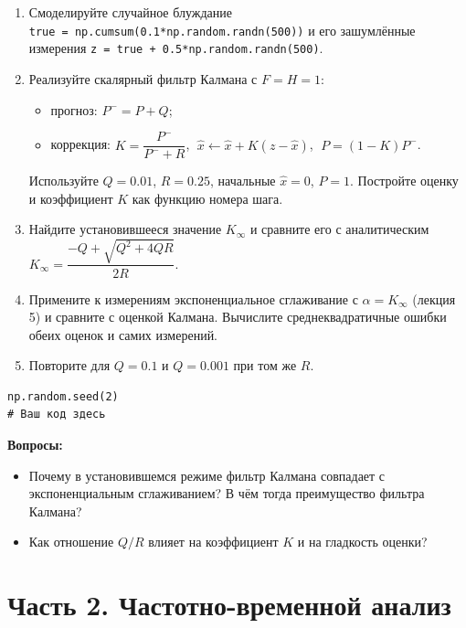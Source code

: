 \documentclass[12pt,a4paper,openany]{book}
\providecommand{\tightlist}{\setlength{\itemsep}{0pt}\setlength{\parskip}{0pt}}
\begin{document}
\begin{enumerate}
\def\labelenumi{\arabic{enumi}.}
\tightlist
\item
  Смоделируйте случайное блуждание \texttt{true\ =\allowbreak{}\ np.\allowbreak{}cumsum(\allowbreak{}0.\allowbreak{}1*np.\allowbreak{}random.\allowbreak{}randn(\allowbreak{}500))} и его зашумлённые измерения \texttt{z\ =\allowbreak{}\ true\ +\ 0.\allowbreak{}5*np.\allowbreak{}random.\allowbreak{}randn(\allowbreak{}500)}.
\item
  Реализуйте скалярный фильтр Калмана с \(F = H = 1\):

  \begin{itemize}
  \tightlist
  \item
    прогноз: \(P^- = P + Q\);
  \item
    коррекция: \(K = \dfrac{P^-}{P^- + R}\), \(\;\hat x \leftarrow \hat x + K(z - \hat x)\), \(\;P = (1 - K)P^-\).
  \end{itemize}

  Используйте \(Q = 0.01\), \(R = 0.25\), начальные \(\hat x = 0\), \(P = 1\). Постройте оценку и коэффициент \(K\) как функцию номера шага.
\item
  Найдите установившееся значение \(K_\infty\) и сравните его с аналитическим \(K_\infty = \dfrac{-Q + \sqrt{Q^2 + 4QR}}{2R}\).
\item
  Примените к измерениям экспоненциальное сглаживание с \(\alpha = K_\infty\) (лекция 5) и сравните с оценкой Калмана. Вычислите среднеквадратичные ошибки обеих оценок и самих измерений.
\item
  Повторите для \(Q = 0.1\) и \(Q = 0.001\) при том же \(R\).
\end{enumerate}

\begin{Verbatim}[fontsize=\small, breaklines, breakanywhere, frame=single, framesep=2mm]
np.random.seed(2)
# Ваш код здесь
\end{Verbatim}

\textbf{Вопросы:}

\begin{itemize}
\tightlist
\item
  Почему в установившемся режиме фильтр Калмана совпадает с экспоненциальным сглаживанием? В чём тогда преимущество фильтра Калмана?
\item
  Как отношение \(Q/R\) влияет на коэффициент \(K\) и на гладкость оценки?
\end{itemize}

\section*{Часть 2. Частотно-временной анализ}
\end{document}
